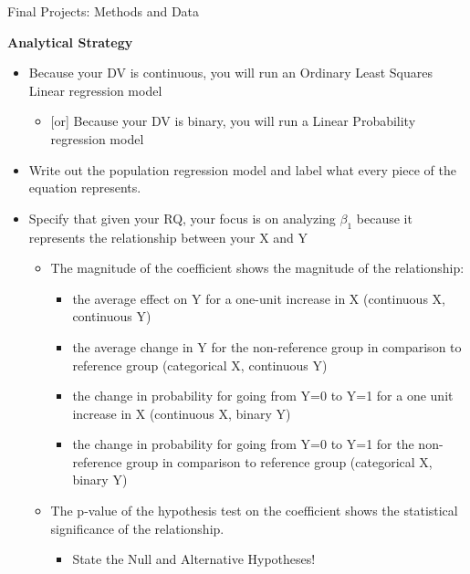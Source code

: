 \documentclass[
  8pt,
  ignorenonframetext,
  dvipsnames]{beamer}
\providecommand{\tightlist}{%
  \setlength{\itemsep}{0pt}\setlength{\parskip}{0pt}}
\renewcommand{\textbf}[1]{{\color{darkgray}\bfseries\fontfamily{Montserrat-TOsF}#1}}
\let\olditem\item
\renewcommand{\item}{%
  \olditem\vspace{4pt}
}
\begin{document}
\begin{frame}{Final Projects: Methods and Data}
\protect\hypertarget{final-projects-methods-and-data-1}{}

\textbf{Analytical Strategy}

\begin{itemize}
\tightlist
\item
  Because your DV is continuous, you will run an Ordinary Least Squares
  Linear regression model

  \begin{itemize}
  \tightlist
  \item
    {[}or{]} Because your DV is binary, you will run a Linear
    Probability regression model
  \end{itemize}
\item
  Write out the population regression model and label what every piece
  of the equation represents.
\item
  Specify that given your RQ, your focus is on analyzing \(\beta_1\)
  because it represents the relationship between your X and Y

  \begin{itemize}
  \tightlist
  \item
    The magnitude of the coefficient shows the magnitude of the
    relationship:

    \begin{itemize}
    \tightlist
    \item
      the average effect on Y for a one-unit increase in X (continuous
      X, continuous Y)
    \item
      the average change in Y for the non-reference group in comparison
      to reference group (categorical X, continuous Y)
    \item
      the change in probability for going from Y=0 to Y=1 for a one unit
      increase in X (continuous X, binary Y)
    \item
      the change in probability for going from Y=0 to Y=1 for the
      non-reference group in comparison to reference group (categorical
      X, binary Y)
    \end{itemize}
  \item
    The p-value of the hypothesis test on the coefficient shows the
    statistical significance of the relationship.

    \begin{itemize}
    \tightlist
    \item
      State the Null and Alternative Hypotheses!
    \end{itemize}
  \end{itemize}
\end{itemize}


\end{frame}
\end{document}
